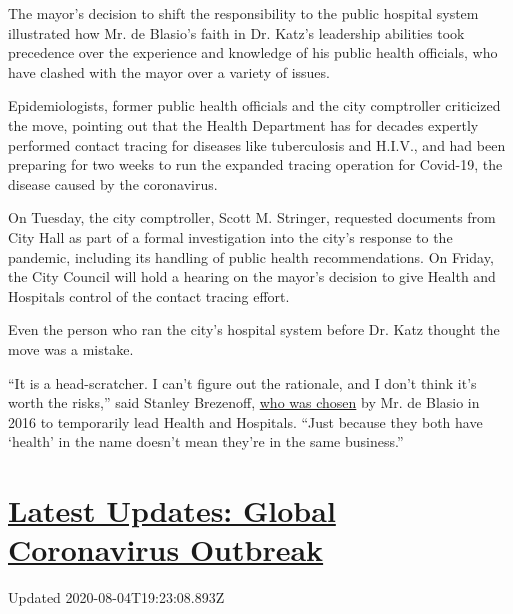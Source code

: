 The mayor's decision to shift the responsibility to the public hospital
system illustrated how Mr. de Blasio's faith in Dr. Katz's leadership
abilities took precedence over the experience and knowledge of his
public health officials, who have clashed with the mayor over a variety
of issues.

Epidemiologists, former public health officials and the city comptroller
criticized the move, pointing out that the Health Department has for
decades expertly performed contact tracing for diseases like
tuberculosis and H.I.V., and had been preparing for two weeks to run the
expanded tracing operation for Covid-19, the disease caused by the
coronavirus.

On Tuesday, the city comptroller, Scott M. Stringer, requested documents
from City Hall as part of a formal investigation into the city's
response to the pandemic, including its handling of public health
recommendations. On Friday, the City Council will hold a hearing on the
mayor's decision to give Health and Hospitals control of the contact
tracing effort.

Even the person who ran the city's hospital system before Dr. Katz
thought the move was a mistake.

``It is a head-scratcher. I can't figure out the rationale, and I don't
think it's worth the risks,'' said Stanley Brezenoff,
\href{https://www.nytimes3xbfgragh.onion/2016/11/08/nyregion/chief-of-new-yorks-struggling-public-hospital-system-is-resigning.html}{who
was chosen} by Mr. de Blasio in 2016 to temporarily lead Health and
Hospitals. ``Just because they both have `health' in the name doesn't
mean they're in the same business.''

\hypertarget{latest-updates-global-coronavirus-outbreak}{%
\section{\texorpdfstring{\href{https://www.nytimes3xbfgragh.onion/2020/08/04/world/coronavirus-cases.html?action=click\&pgtype=Article\&state=default\&region=MAIN_CONTENT_1\&context=storylines_live_updates}{Latest
Updates: Global Coronavirus
Outbreak}}{Latest Updates: Global Coronavirus Outbreak}}\label{latest-updates-global-coronavirus-outbreak}}

Updated 2020-08-04T19:23:08.893Z

